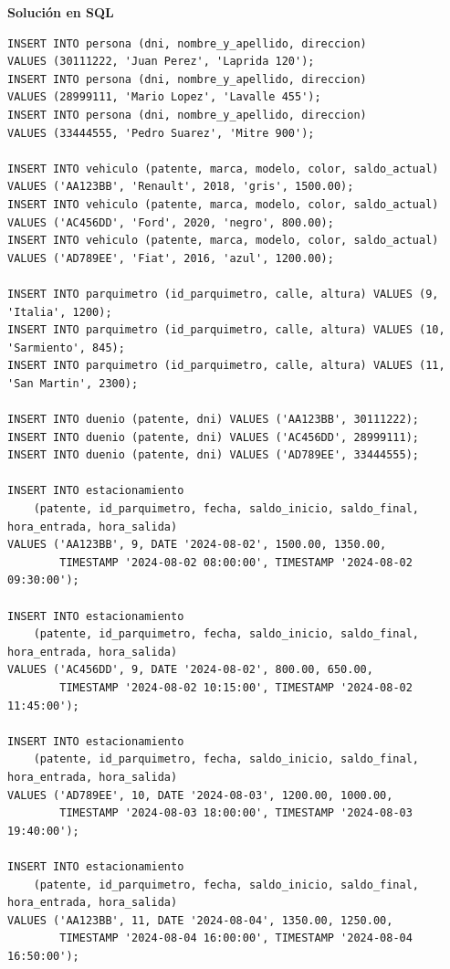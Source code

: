 \documentclass[11pt,a4paper]{article}
\newcommand{\itemcabecera}[1]{\noindent\textbf{#1}\par\medskip}
\newcommand{\bloqueSolucion}{\itemcabecera{Soluci\'on en SQL}}
\begin{document}
\bloqueSolucion

\begin{lstlisting}
INSERT INTO persona (dni, nombre_y_apellido, direccion)
VALUES (30111222, 'Juan Perez', 'Laprida 120');
INSERT INTO persona (dni, nombre_y_apellido, direccion)
VALUES (28999111, 'Mario Lopez', 'Lavalle 455');
INSERT INTO persona (dni, nombre_y_apellido, direccion)
VALUES (33444555, 'Pedro Suarez', 'Mitre 900');

INSERT INTO vehiculo (patente, marca, modelo, color, saldo_actual)
VALUES ('AA123BB', 'Renault', 2018, 'gris', 1500.00);
INSERT INTO vehiculo (patente, marca, modelo, color, saldo_actual)
VALUES ('AC456DD', 'Ford', 2020, 'negro', 800.00);
INSERT INTO vehiculo (patente, marca, modelo, color, saldo_actual)
VALUES ('AD789EE', 'Fiat', 2016, 'azul', 1200.00);

INSERT INTO parquimetro (id_parquimetro, calle, altura) VALUES (9, 'Italia', 1200);
INSERT INTO parquimetro (id_parquimetro, calle, altura) VALUES (10, 'Sarmiento', 845);
INSERT INTO parquimetro (id_parquimetro, calle, altura) VALUES (11, 'San Martin', 2300);

INSERT INTO duenio (patente, dni) VALUES ('AA123BB', 30111222);
INSERT INTO duenio (patente, dni) VALUES ('AC456DD', 28999111);
INSERT INTO duenio (patente, dni) VALUES ('AD789EE', 33444555);

INSERT INTO estacionamiento
    (patente, id_parquimetro, fecha, saldo_inicio, saldo_final, hora_entrada, hora_salida)
VALUES ('AA123BB', 9, DATE '2024-08-02', 1500.00, 1350.00,
        TIMESTAMP '2024-08-02 08:00:00', TIMESTAMP '2024-08-02 09:30:00');

INSERT INTO estacionamiento
    (patente, id_parquimetro, fecha, saldo_inicio, saldo_final, hora_entrada, hora_salida)
VALUES ('AC456DD', 9, DATE '2024-08-02', 800.00, 650.00,
        TIMESTAMP '2024-08-02 10:15:00', TIMESTAMP '2024-08-02 11:45:00');

INSERT INTO estacionamiento
    (patente, id_parquimetro, fecha, saldo_inicio, saldo_final, hora_entrada, hora_salida)
VALUES ('AD789EE', 10, DATE '2024-08-03', 1200.00, 1000.00,
        TIMESTAMP '2024-08-03 18:00:00', TIMESTAMP '2024-08-03 19:40:00');

INSERT INTO estacionamiento
    (patente, id_parquimetro, fecha, saldo_inicio, saldo_final, hora_entrada, hora_salida)
VALUES ('AA123BB', 11, DATE '2024-08-04', 1350.00, 1250.00,
        TIMESTAMP '2024-08-04 16:00:00', TIMESTAMP '2024-08-04 16:50:00');
\end{lstlisting}
\end{document}
